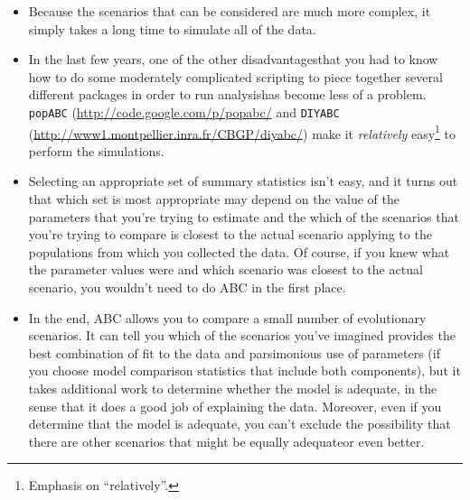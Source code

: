 \begin{itemize}

\item Because the scenarios that can be considered are much more
  complex, it simply takes a long time to simulate all of the data. 

\item In the last few years, one of the other disadvantages{\dash}that
  you had to know how to do some moderately complicated scripting to
  piece together several different packages in order to run
  analysis{\dash}has become less of a problem. {\tt popABC}
  (\url{http://code.google.com/p/popabc/} and {\tt DIYABC}
  (\url{http://www1.montpellier.inra.fr/CBGP/diyabc/}) make it {\it
    relatively\/} easy\footnote{Emphasis on ``relatively''.} to
  perform the simulations.

\item Selecting an appropriate set of summary statistics isn't easy,
  and it turns out that which set is most appropriate may depend on
  the value of the parameters that you're trying to estimate and the
  which of the scenarios that you're trying to compare is closest to
  the actual scenario applying to the populations from which you
  collected the data. Of course, if you knew what the parameter values
  were and which scenario was closest to the actual scenario, you
  wouldn't need to do ABC in the first place.

\item In the end, ABC allows you to compare a small number of
  evolutionary scenarios. It can tell you which of the scenarios
  you've imagined provides the best combination of fit to the data and
  parsimonious use of parameters (if you choose model comparison
  statistics that include both components), but it takes additional
  work to determine whether the model is adequate, in the sense that
  it does a good job of explaining the data. Moreover, even if you
  determine that the model is adequate, you can't exclude the
  possibility that there are other scenarios that might be equally
  adequate{\dash}or even better.

\end{itemize}

